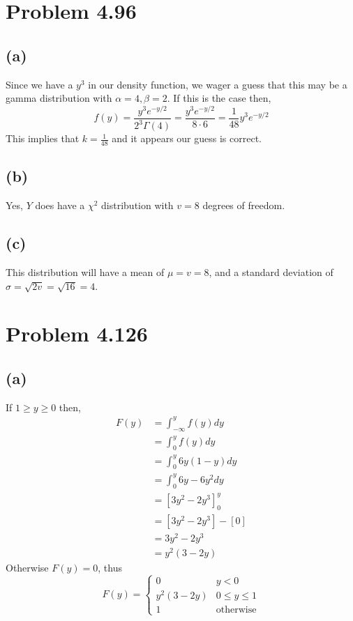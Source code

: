 \documentclass{article}
\theoremstyle{definition}
\begin{document}
\section*{Problem 4.96}

    \subsection*{(a)}
        Since we have a $y^3$ in our density function, we wager a guess that this may be a gamma distribution with 
        $\alpha = 4, \beta = 2$. If this is the case then,
        \[
            f(y) = \frac{y^3 e^{-y / 2}}{2^3 \Gamma(4)} = \frac{y^3 e^{-y / 2}}{8 \cdot 6} = \frac {1}{48} y^3 e^{-y / 2} 
        \]
        This implies that $k = \frac{1}{48}$ and it appears our guess is correct.

    \subsection*{(b)}
        Yes, $Y$ does have a $\chi^2$ distribution with $v=8$ degrees of freedom.

    \subsection*{(c)}
        This distribution will have a mean of $\mu = v = 8$, and a standard deviation of $\sigma = \sqrt{2v} =
         \sqrt{16} = 4$.
        
\section*{Problem 4.126}

    \subsection*{(a)}
        If $1 \geq y \geq 0$ then,
        \begin{align*}
            F(y) &= \int_{-\infty}^y f(y) dy\\
            &= \int_0^y f(y) dy \\
            &= \int_0^y 6y(1-y) dy \\
            &= \int_0^y 6y - 6y^2 dy\\
            &= \left[3y^2 - 2y^3\right]_0^y\\
            &= [3y^2 - 2y^3] - [0]\\
            &= 3y^2 - 2y^3\\
            &= y^2(3 - 2y)
        \end{align*}
        Otherwise $F(y) = 0$, thus 
        \[
            F(y) = 
            \begin{cases}
                0 & y < 0\\
                y^2(3-2y) & 0 \leq y \leq 1\\
                1 & \text{otherwise}
            \end{cases}
        \]
\end{document}
